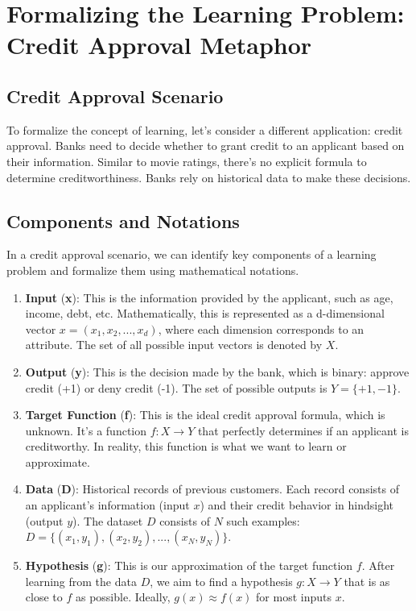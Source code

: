 \documentclass{article}
\begin{document}
\section{Formalizing the Learning Problem: Credit Approval Metaphor}
\subsection{Credit Approval Scenario}
To formalize the concept of learning, let's consider a different application: credit approval. Banks need to decide whether to grant credit to an applicant based on their information. Similar to movie ratings, there's no explicit formula to determine creditworthiness. Banks rely on historical data to make these decisions.

\subsection{Components and Notations}
In a credit approval scenario, we can identify key components of a learning problem and formalize them using mathematical notations.

\begin{enumerate}
    \item \textbf{Input} (\textbf{x}): This is the information provided by the applicant, such as age, income, debt, etc. Mathematically, this is represented as a d-dimensional vector $x = (x_1, x_2, ..., x_d)$, where each dimension corresponds to an attribute. The set of all possible input vectors is denoted by $X$.
    \item \textbf{Output} (\textbf{y}): This is the decision made by the bank, which is binary: approve credit (+1) or deny credit (-1). The set of possible outputs is $Y = \{+1, -1\}$.
    \item \textbf{Target Function} (\textbf{f}): This is the ideal credit approval formula, which is unknown. It's a function $f: X \rightarrow Y$ that perfectly determines if an applicant is creditworthy. In reality, this function is what we want to learn or approximate.
    \item \textbf{Data} (\textbf{D}): Historical records of previous customers. Each record consists of an applicant's information (input $x$) and their credit behavior in hindsight (output $y$). The dataset $D$ consists of $N$ such examples: $D = \{(x_1, y_1), (x_2, y_2), ..., (x_N, y_N)\}$.
    \item \textbf{Hypothesis} (\textbf{g}): This is our approximation of the target function $f$.  After learning from the data $D$, we aim to find a hypothesis $g: X \rightarrow Y$ that is as close to $f$ as possible. Ideally, $g(x) \approx f(x)$ for most inputs $x$.
\end{enumerate}
\end{document}
